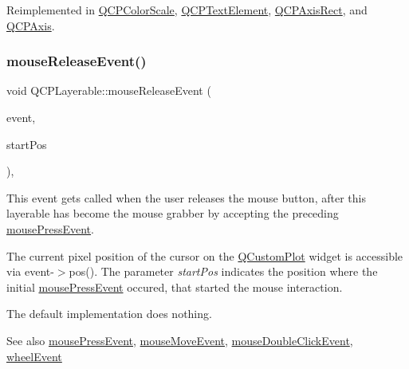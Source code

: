 Reimplemented in \mbox{\hyperlink{class_q_c_p_color_scale_a91f633b97ffcd57fdf8cd814974c20e6}{Q\+C\+P\+Color\+Scale}}, \mbox{\hyperlink{class_q_c_p_text_element_ad7b2c98355e3d2f912574b74fcee0574}{Q\+C\+P\+Text\+Element}}, \mbox{\hyperlink{class_q_c_p_axis_rect_aa9a7c807eaa4666870ac94aa6abc4dde}{Q\+C\+P\+Axis\+Rect}}, and \mbox{\hyperlink{class_q_c_p_axis_a61bc07cda6193a3fa6b5aa198fc4e4fa}{Q\+C\+P\+Axis}}.

\mbox{\label{class_q_c_p_layerable_aa0d79b005686f668622bbe66ac03ba2c}} 
\subsubsection{\texorpdfstring{mouseReleaseEvent()}{mouseReleaseEvent()}}
{\footnotesize\ttfamily void Q\+C\+P\+Layerable\+::mouse\+Release\+Event (\begin{DoxyParamCaption}\item[{Q\+Mouse\+Event $\ast$}]{event,  }\item[{const Q\+PointF \&}]{start\+Pos }\end{DoxyParamCaption})\hspace{0.3cm}{\ttfamily [protected]}, {\ttfamily [virtual]}}

This event gets called when the user releases the mouse button, after this layerable has become the mouse grabber by accepting the preceding \mbox{\hyperlink{class_q_c_p_layerable_af6567604818db90f4fd52822f8bc8376}{mouse\+Press\+Event}}.

The current pixel position of the cursor on the \mbox{\hyperlink{class_q_custom_plot}{Q\+Custom\+Plot}} widget is accessible via {\ttfamily event-\/$>$pos()}. The parameter {\itshape start\+Pos} indicates the position where the initial \mbox{\hyperlink{class_q_c_p_layerable_af6567604818db90f4fd52822f8bc8376}{mouse\+Press\+Event}} occured, that started the mouse interaction.

The default implementation does nothing.

\begin{DoxySeeAlso}{See also}
\mbox{\hyperlink{class_q_c_p_layerable_af6567604818db90f4fd52822f8bc8376}{mouse\+Press\+Event}}, \mbox{\hyperlink{class_q_c_p_layerable_a9eee1ba47fd69be111059ca3881933e4}{mouse\+Move\+Event}}, \mbox{\hyperlink{class_q_c_p_layerable_a4171e2e823aca242dd0279f00ed2de81}{mouse\+Double\+Click\+Event}}, \mbox{\hyperlink{class_q_c_p_layerable_a47dfd7b8fd99c08ca54e09c362b6f022}{wheel\+Event}} 
\end{DoxySeeAlso}


